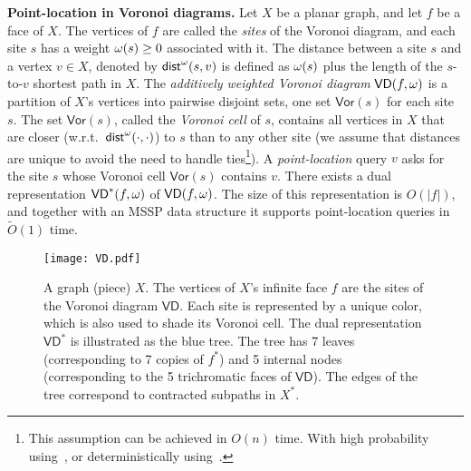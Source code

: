 \documentclass{article}
\newcommand{\Vor}{\textsf{Vor}}
\newcommand{\dist}{\mathsf{dist}}
\newcommand{\VD}{\textsf{VD}}
\newcommand{\weight}{{\rm \omega}}
\newcommand{\X}{X}
\newcommand{\Otild}{\tilde{O}}
\begin{document}
\medskip
\noindent
{\bf Point-location in Voronoi diagrams.}
Let $\X$ be a planar graph, and let $f$ be a face of $\X$. The vertices of $f$ are called the {\em sites} of the Voronoi diagram, and each site $s$ has a weight $\weight(s)\geq 0$ associated with it.
The distance between a site $s$ and a vertex $v\in \X$, denoted by $\dist^\weight(s,v)$ is defined as $\weight(s)$ plus the length of the $s$-to-$v$ shortest path in $\X$.
The {\em additively weighted Voronoi diagram} $\VD(f,\weight)$ is a partition of $\X$'s vertices into pairwise disjoint sets, one set $\Vor(s)$ for each site $s$. The set $\Vor(s)$, called the {\em Voronoi cell} of $s$, contains all vertices in $\X$ that are closer (w.r.t.~$\dist^\weight(\cdot,\cdot)$) to $s$ than to any other site (we assume that  distances are unique to avoid the need to handle ties\footnote{This assumption can be achieved in $O(n)$ time. With high probability using~\cite{Isolation,Isolation2}, or deterministically using~\cite{Isolation3}.}).
A {\em point-location} query $v$ asks for the site $s$ whose Voronoi cell $\Vor(s)$ contains $v$.
There exists a dual representation $\VD^*(f,\weight)$ of $\VD(f,\weight)$. The size of this representation is $O(|f|)$, and together with an MSSP data structure it supports point-location queries in $\Otild(1)$ time.


\begin{figure}[htb]
\begin{minipage}[c]{0.25\textwidth}
    \texttt{[image: VD.pdf]}
  \end{minipage}\hfill
  \begin{minipage}[c]{0.7\textwidth}
    \caption{A graph (piece) $\X$. The vertices of $\X$'s infinite face $f$ are the sites of the Voronoi diagram $\VD$. Each site is represented by a unique color, which is also used to shade its Voronoi cell. The dual representation $\VD^*$ is illustrated as the blue tree. The tree has 7 leaves (corresponding to 7 copies of $f^*$) and 5 internal nodes (corresponding to the 5  trichromatic faces of $\VD$). The edges of the tree correspond to contracted subpaths in $\X^*$. \label{fig:VD}}
  \end{minipage}
\end{figure}
\end{document}
